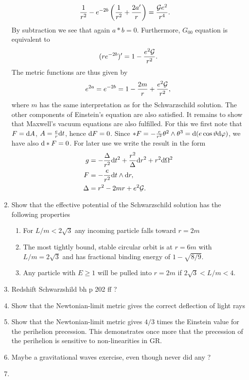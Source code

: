 \begin{enumerate}
\begin{align}
		\frac{1}{r^2} - e^{-2b} \left(\frac{1}{r^2} + \frac{2 a^\prime}{r}\right) &= \frac{\mathcal{G} e^2}{r^4}.
	\end{align}
By subtraction we see that again $a*b=0$. Furthermore, $G_{00}$ equation is equivalent to
\begin{equation}
	(r e^{-2b})^\prime = 1 - \frac{e^2 \mathcal{G}}{r^2}.
\end{equation}
The metric functions are thus given by
\begin{equation}
	e^{2a} = e^{-2b} = 1 - \frac{2m}{r} + \frac{e^2 \mathcal{G}}{r^2},
\end{equation}
where $m$ has the same interpretation as for the Schwarzschild solution. The other components of Einstein's equation are also satisfied. It remains to show that Maxwell's vacuum equations are also fulfilled. For this we first note that $F=\mathrm{d} A$, $A=\frac{e}{r} \mathrm{d} t$, hence $\mathrm{d} F=0$. Since $*F=-\frac{e}{r^2} \theta^2 \wedge \theta^3=\mathrm{d} (e \cos \vartheta \mathrm{d} \varphi)$, we have also $\mathrm{d} * F =0$. For later use we write the result in the form
\begin{align}
	g &= - \frac{\Delta}{r^2} \mathrm{d} t^2 + \frac{r^2}{\Delta} \mathrm{d} r^2 + r^2 \mathrm{d} \Omega^2 \\
	F&= - \frac{e}{r^2} \mathrm{d} t \wedge \mathrm{d} r,\\
	\Delta &= r^2 - 2mr + e^2 \mathcal{G}.
\end{align}
	

\item Show that the effective potential of the Schwarzschild solution has the following properties
\begin{enumerate}
	\item For $L/m < 2 \sqrt{3}$ any incoming particle falls toward $r=2m$
	\item The most tightly bound, stable circular orbit is at $r=6m$ with $L/m=2 \sqrt{3}$ and has fractional binding energy of $1-\sqrt{8/9}$.
	\item Any particle with $E\geq 1$ will be pulled into $r=2m$ if $2\sqrt{3} < L/m < 4$.
\end{enumerate}
\item Redshift Schwarzshild bh p 202 ff ?
\item Show that the Newtonian-limit metric gives the correct deflection of light rays
\item Show that the Newtonian-limit metric gives $4/3$ times the Einstein value for the perihelion precession. This demonstrates once more that the precession of the perihelion is sensitive to non-linearities in GR.
\item Maybe a gravitational waves exercise, even though never did any ?
\item 
\end{enumerate}








